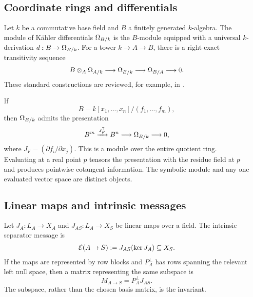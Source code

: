 \subsection{Coordinate rings and differentials}

Let \(k\) be a commutative base field and \(B\) a finitely generated
\(k\)-algebra.  The module of K\"ahler differentials \(\Omega_{B/k}\) is the
\(B\)-module equipped with a universal \(k\)-derivation
\(d:B\to\Omega_{B/k}\).  For a tower \(k\to A\to B\), there is a right-exact
transitivity sequence
\begin{equation}
  B\otimes_A\Omega_{A/k}
  \longrightarrow \Omega_{B/k}
  \longrightarrow \Omega_{B/A}
  \longrightarrow 0.
  \label{eq:kahler-transitivity}
\end{equation}
These standard constructions are reviewed, for example, in
\cite{Eisenbud1995,StacksDifferentials}.

If
\begin{equation}
  B=k[x_1,\ldots,x_n]/(f_1,\ldots,f_m),
\end{equation}
then \(\Omega_{B/k}\) admits the presentation
\begin{equation}
  B^m \xrightarrow{J_F^{\mathsf T}} B^n
  \longrightarrow \Omega_{B/k}\longrightarrow 0,
  \label{eq:jacobian-presentation}
\end{equation}
where \(J_F=(\partial f_i/\partial x_j)\).  This is a module over the entire
quotient ring.  Evaluating at a real point \(p\) tensors the presentation with
the residue field at \(p\) and produces pointwise cotangent information.  The
symbolic module and any one evaluated vector space are distinct objects.

\subsection{Linear maps and intrinsic messages}

Let \(J_A:L_A\to X_A\) and \(J_{AS}:L_A\to X_S\) be linear maps over a field.
The intrinsic separator message is
\begin{equation}
  \mathcal{E}(A\to S)
  :=J_{AS}(\operatorname{ker} J_A)\subseteq X_S.
  \label{eq:intrinsic-linear-message}
\end{equation}
If the maps are represented by row blocks and \(P_A^\perp\) has rows spanning
the relevant left null space, then a matrix representing the same subspace is
\begin{equation}
  M_{A\to S}=P_A^\perp J_{AS}.
\end{equation}
The subspace, rather than the chosen basis matrix, is the invariant.

